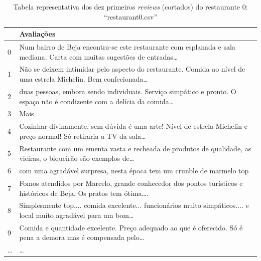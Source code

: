 \documentclass[a4paper,10pt]{article}
\begin{document}
\begin{table}[!ht]
  \centering
  \begin{adjustbox}{width=\columnwidth,center}
    \begin{tabular}{|l|l|}
      \hline
      ~      & Avaliações                                                                                                                  \\ \hline
      0      & Num bairro de Beja encontra-se este restaurante com esplanada e sala mediana. Carta com muitas sugestões de entradas\ldots  \\ \hline
      1      & Não se deixem intimidar pelo aspecto do restaurante. Comida ao nível de uma estrela Michelin. Bem confecionada\ldots        \\ \hline
      2      & duas pessoas, embora sendo individuais. Serviço simpático e pronto. O espaço não é condizente com a delícia da comida\ldots \\ \hline
      3      & Mais                                                                                                                        \\ \hline
      4      & Cozinhar divinamente, sem dúvida é uma arte! Nível de estrela Michelin e preço normal! Só retiraria a TV da sala\ldots      \\ \hline
      5      & Restaurante com um ementa vasta e recheada de produtos de qualidade, as vieiras, o biqueirão são exemplos de\ldots          \\ \hline
      6      & com uma agradável surpresa, nesta época tem um crunble de marmelo top                                                       \\ \hline
      7      & Fomos atendidos por Marcelo, grande conhecedor dos pontos turísticos e históricos de Beja. Os pratos tem ótima\ldots.       \\ \hline
      8      & Simplesmente top.... comida excelente... funcionários muito simpáticos.... e local muito agradável para um bom\ldots        \\ \hline
      9      & Comida e quantidade excelente. Preço adequado ao que é oferecido. Só é pena a demora mas é compensada pelo\ldots            \\ \hline
      \ldots & \ldots                                                                                                                      \\ \hline
    \end{tabular}
  \end{adjustbox}
  \caption{Tabela representativa dos dez primeiros \textit{reviews} (cortados) do restaurante 0: ``restaurant0.csv''}
\end{table}
\end{document}
